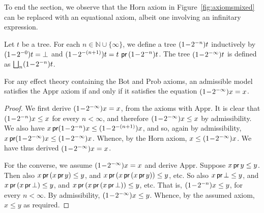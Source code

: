 To end the section, we observe that the Horn axiom in Figure~\ref{fig:axiomsmixed} can be replaced with an equational axiom, albeit one involving an infinitary expression.



\begin{definition}
    \label{def:probaApproxConstruct}
    Let $t$ be a  tree. For each $n \in \mathbb{N} \cup \{\infty\}$, we define a tree $\Iter{t}{n}$ inductively by
    $\Iter{t}{0} = \bot$ and $\Iter{t}{(n+1)}  = t\,  \prEff \,\Iter{t}{n}$. The
    tree $\Iter{t}{\infty}$ is defined as $\bigsqcup_n \Iter{t}{n}$.
\end{definition}

\begin{proposition}%
\label{proposition:horn}
    For any effect theory containing the Bot and Prob axioms, an admissible model satisfies the $\text{Appr}$
     axiom if and only if it satisfies the equation 
    $\Iterx{\infty}= x$.
\end{proposition}

\begin{proof} We first derive $\Iterx{\infty}= x$, from the axioms with $\text{Appr}$.
    It is clear that $\Iterx{n} \leq  x$ for every $n < \infty$,
    and therefore $\Iterx{\infty} \leq  x$ by admissibility.
    We also have $x \prEff \Iterx{n} \leq  \Iterx{(n+1)}$,
    and so, again by admissibility, $x \prEff \Iterx{\infty} \leq \Iterx{\infty}$.
    Whence, by the Horn axiom, $x  \leq \Iterx{\infty}$. 
     We have thus derived $\Iterx{\infty}= x$.

    For the converse, we assume $\Iterx{\infty}= x$ and derive  $\text{Appr}$.
    Suppose $x \prEff y \leq y$.  Then also  $x \prEff \, (x \prEff y) \leq y$, and $x \prEff \, ( x \prEff \, (x \prEff y)) \leq y$, etc. So also $x \prEff \bot \leq y$, and $x \prEff \, (x \prEff \bot) \leq y$, and $x \prEff \, ( x \prEff \, (x \prEff \bot)) \leq y$,
 etc. That is, $\Iterx{n} \leq y$, for every $n < \infty$. By admissibility, $\Iterx{\infty} \leq y$. Whence, by the assumed axiom, $x \leq y$ as required.
 \end{proof}
